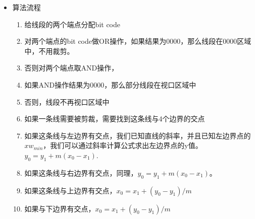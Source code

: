 \documentclass[UTF8]{ctexart}
\begin{document}
\begin{itemize}
    \item 算法流程
    \begin{enumerate}
        \item 给线段的两个端点分配bit code
        \item 对两个端点的bit code做OR操作，如果结果为0000，那么线段在0000区域中，不用裁剪。
        \item 否则对两个端点取AND操作，
        \item 如果AND操作结果为0000，那么部分线段在视口区域中
        \item 否则，线段不再视口区域中
        \item 如果一条线需要被剪裁，需要找到这条线与4个边界的交点
        \item 如果这条线与左边界有交点，我们已知直线的斜率，并且已知左边界点的$xw_{min}$，我们可以通过斜率计算公式求出左边界点的y值。$y_{0}=y_{1}+m(x_{0}-x_{1})$.
        \item 如果这条线与右边界有交点，同理，$y_{0}=y_{1}+m(x_{0}-x_{1})$。
        \item 如果这条线与上边界有交点，$x_{0}=x_{1}+(y_{0}-y_{1})/m$
        \item 如果与下边界有交点，$x_{0}=x_{1}+(y_{0}-y_{1})/m$
    \end{enumerate}
\end{itemize}
\end{document}
